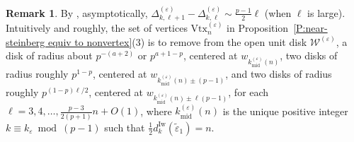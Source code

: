 \documentclass[12pt]{amsart}
\theoremstyle{definition}
\newtheorem{remark}[subsection]{Remark}
\numberwithin{equation}{subsection}
\def\calW{\mathcal{W}}
\newcommand{\Iw}{\mathrm{Iw}}
\newcommand{\Vtx}{\mathrm{Vtx}}
\begin{document}
\begin{remark}
By \cite[Lemma~5.2]{liu-truong-xiao-zhao}, asymptotically, 
$\Delta_{k, \ell+1}^{(\varepsilon)}-\Delta_{k,\ell}^{(\varepsilon)} \sim \frac{p-1}2 \ell$ (when $\ell$ is large). 
Intuitively and roughly, the set of vertices $\Vtx_n^{(\varepsilon)}$ in Proposition~\ref{P:near-steinberg equiv to nonvertex}(3) is to remove from the open unit disk $\calW^{(\varepsilon)}$, a disk of radius about $p^{-(a+2)}$ or $p^{a+1-p}$, centered at $w_{k_{\mathrm{mid}}^{(\varepsilon)}(n)}$, two disks of radius roughly $p^{1-p}$, centered at $w_{k_{\mathrm{mid}}^{(\varepsilon)}(n) \pm (p-1)}$, and two disks of radius roughly $p^{(1-p)\ell/2}$,  centered at $w_{k_{\mathrm{mid}}^{(\varepsilon)}(n) \pm \ell(p-1)}$, for each $\ell = 3,4,\dots, \frac{p-3}{2(p+1)}n + O(1)$, where $k_{\mathrm{mid}}^{(\varepsilon)}(n) $ is the unique positive integer $k \equiv k_\varepsilon \bmod(p-1)$ such that $\frac 12d_k^\Iw(\tilde \varepsilon_1) = n$.
\end{remark}
\end{document}
